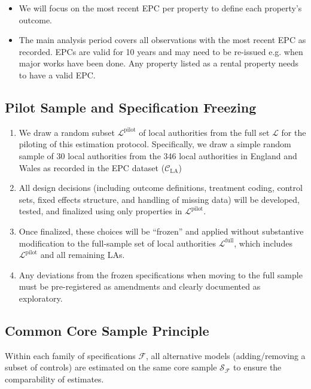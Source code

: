 \documentclass[12pt]{article}
\begin{document}
\begin{itemize}
    \item We will focus on the most recent EPC per property to define each property's outcome.
    \item The main analysis period covers all observations with the most recent EPC as recorded. EPCs are valid for 10 years and may need to be re-issued e.g. when major works have been done. Any property listed as a rental property needs to have a valid EPC. 
\end{itemize}

\subsection{Pilot Sample and Specification Freezing}

\begin{enumerate}
    \item We draw a random subset $\mathcal{L}^{\text{pilot}}$ of local authorities from the full set $\mathcal{L}$ for the piloting of this estimation protocol. Specifically, we draw a simple random sample of 30 local authorities from the 346 local authorities in England and Wales as recorded in the EPC dataset ($\mathcal{C}_{\text{LA}}$)
    \item All design decisions (including outcome definitions, treatment coding, control sets, fixed effects structure, and handling of missing data) will be developed, tested, and finalized using only properties in $\mathcal{L}^{\text{pilot}}$.
    \item Once finalized, these choices will be ``frozen'' and applied without substantive modification to the full-sample set of local authorities $\mathcal{L}^{\text{full}}$, which includes $\mathcal{L}^{\text{pilot}}$ and all remaining LAs.
    \item Any deviations from the frozen specifications when moving to the full sample must be pre-registered as amendments and clearly documented as exploratory.
\end{enumerate}

\subsection{Common Core Sample Principle}
Within each family  of specifications $\mathcal{F}$, all alternative models (adding/removing a subset of controls) are estimated on the same core sample $\mathcal{S}_\mathcal{F}$ to ensure the comparability of estimates.
\end{document}

